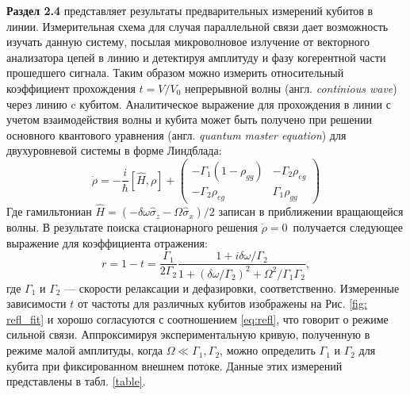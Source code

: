 \textbf{Раздел 2.4} представляет результаты предварительных измерений кубитов в линии. Измерительная схема для случая параллельной связи дает возможность изучать данную систему, посылая микроволновое излучение от векторного анализатора цепей в линию и детектируя амплитуду и фазу когерентной части прошедшего сигнала. Таким образом можно измерить относительный коэффициент прохождения $t=V/V_0$ непрерывной волны (англ. \textit{continious wave}) через линию c кубитом. Аналитическое выражение для прохождения в линии с учетом взаимодействия волны и кубита может быть получено при решении основного квантового уравнения (англ. \textit{quantum master equation}) для двухуровневой системы в форме Линдблада: 
\begin{equation}
\dot{\rho}=-\frac{i}{\hbar}[\hat{H},\rho] + 
\begin{pmatrix}
-\Gamma_1 (1-\rho_{gg})& -\Gamma_2 \rho_{eg}\\
-\Gamma_2 \rho_{eg}&\Gamma_1 \rho_{gg}
\end{pmatrix}
\label{eq:master}
\end{equation}
Где гамильтониан $\hat{H} = (-\delta\omega\hat{\sigma}_z -\Omega\hat{\sigma}_x)/2$ записан в приближении вращающейся волны. В результате поиска стационарного решения $\dot{\rho}=0$~получается следующее выражение для коэффициента отражения:
\begin{equation}
r = 1-t = \frac{\Gamma_1}{2\Gamma_2}\frac{1+i\delta\omega/\Gamma_2}{1+(\delta\omega/\Gamma_2)^2 + \Omega^2/\Gamma_1\Gamma_2},
\label{eq:refl}
\end{equation}
где $\Gamma_1$ и $\Gamma_2$ --- скорости релаксации и дефазировки, соответственно. Измеренные зависимости $t$ от частоты для различных кубитов изображены на Рис. \ref{fig: refl_fit} и хорошо согласуются с соотношением \eqref{eq:refl}, что говорит о режиме сильной связи. Аппроксимируя экспериментальную кривую, полученную в режиме малой амплитуды, когда $\Omega \ll \Gamma_1, \Gamma_2$, можно определить $\Gamma_1$ и $\Gamma_2$ для  кубита при фиксированном внешнем потоке. Данные этих измерений представлены в табл. \ref{table}.
